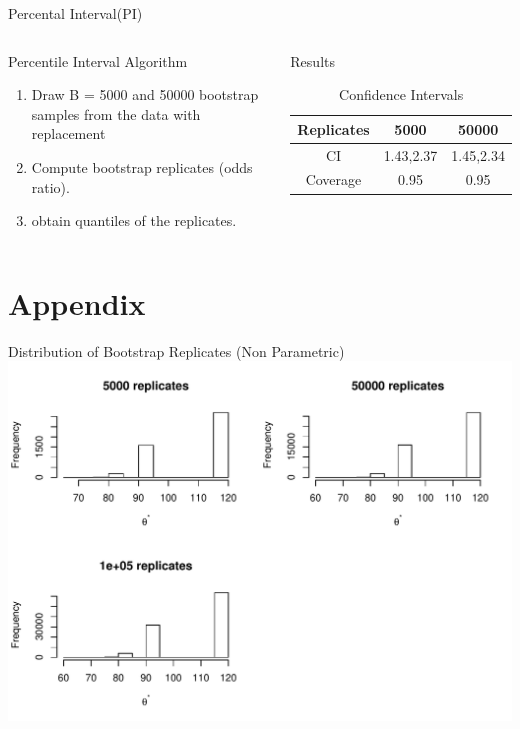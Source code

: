 \documentclass[a4paper,9pt]{beamer}\usepackage[]{graphicx}\usepackage[]{color}
\makeatletter
\def\maxwidth{ %
  \ifdim\Gin@nat@width>\linewidth
    \linewidth
  \else
    \Gin@nat@width
  \fi
}
\newenvironment{knitrout}{}{} %
\makeatother
\begin{document}
\begin{frame}{Percental Interval(PI)}

\begin{columns}
\begin{block}{Percentile Interval Algorithm}
\begin{enumerate}[i]
\item Draw B = 5000 and 50000 bootstrap samples from the data with replacement
\item Compute bootstrap replicates (odds ratio).
\item obtain quantiles of the replicates.
\end{enumerate}

\end{block}

\begin{block}{Results}
\begin{table}[h]
\begin{tabular}{ccc}
\hline
Replicates & 5000 & 50000\\
\hline
CI & 1.43,2.37 & 1.45,2.34\\
Coverage & 0.95 & 0.95\\
\hline
\end{tabular}
\caption{Confidence Intervals}
\end{table}
\end{block}
\end{columns}
\end{frame}

\section{Appendix}
\begin{frame}{Distribution of Bootstrap Replicates (Non Parametric)}
\begin{knitrout}
\color{fgcolor}
\includegraphics[width=\maxwidth]{figure/plots3-1} 

\end{knitrout}
\end{frame}
\end{document}
